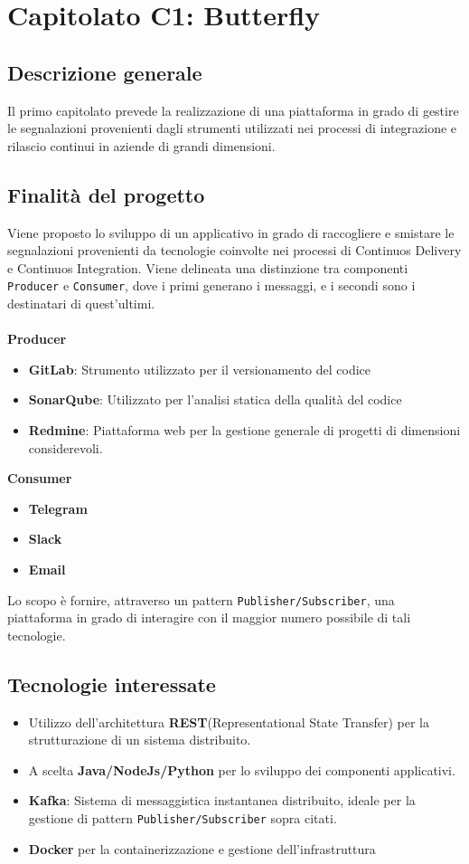 \chapter{Capitolato C1: Butterfly}
\section{Descrizione generale}
Il primo capitolato prevede la realizzazione di una piattaforma in grado di gestire le segnalazioni provenienti dagli strumenti utilizzati nei processi di integrazione e rilascio continui in aziende di grandi dimensioni. 

\section{Finalit\`a del progetto}
Viene proposto lo sviluppo di un applicativo in grado di raccogliere e smistare le segnalazioni provenienti da tecnologie coinvolte nei processi di Continuos Delivery e Continuos Integration.
Viene delineata una distinzione tra componenti \texttt{Producer} e \texttt{Consumer}, dove i primi generano i messaggi, e i secondi sono i destinatari di quest'ultimi.\\
\\
\textbf{Producer}
	\begin{itemize}
	\item \textbf{GitLab}: Strumento utilizzato per il versionamento del codice
	\item \textbf{SonarQube}: Utilizzato per l'analisi statica della qualità del codice
	\item \textbf{Redmine}: Piattaforma web per la gestione generale di progetti di dimensioni considerevoli.
	\end{itemize}
\textbf{Consumer}
	\begin{itemize}	
		\item \textbf{Telegram}
		\item \textbf{Slack}
		\item \textbf{Email}
	\end{itemize}

Lo scopo è fornire, attraverso un pattern \texttt{Publisher/Subscriber}, una piattaforma in grado di interagire con il maggior numero possibile di tali tecnologie. 	
	
	
\section{Tecnologie interessate}
	\begin{itemize}
		\item Utilizzo dell'architettura \textbf{REST}(Representational State Transfer) per la strutturazione di un sistema distribuito.
		\item A scelta \textbf{Java/NodeJs/Python} per lo sviluppo dei componenti applicativi.
		\item \textbf{Kafka}: Sistema di messaggistica instantanea distribuito, ideale per la gestione di pattern \texttt{Publisher/Subscriber} sopra citati. 
		\item \textbf{Docker} per la containerizzazione e gestione dell'infrastruttura
	\end{itemize}

